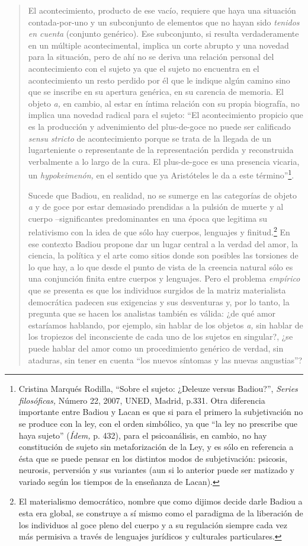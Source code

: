 \begin{quote}
El acontecimiento, producto de ese vacío, requiere que haya una situación contada-por-uno y un subconjunto de elementos que no hayan sido \emph{tenidos en cuenta} (conjunto genérico). Ese subconjunto, si resulta verdaderamente en un múltiple acontecimental, implica un corte abrupto y una novedad para la situación, pero de ahí no se deriva una relación personal del acontecimiento con el sujeto ya que el sujeto no encuentra en el acontecimiento un resto perdido por él que le indique algún camino sino que se inscribe en su apertura genérica, en su carencia de memoria. El objeto \emph{a,} en cambio, al estar en íntima relación con su propia biografía, no implica una novedad radical para el sujeto: \enquote{El acontecimiento propicio que es la producción y advenimiento del plus-de-goce no puede ser calificado \emph{sensu stricto} de acontecimiento porque se trata de la llegada de un lugarteniente o representante de la representación perdida y reconstruida verbalmente a lo largo de la cura. El plus-de-goce es una presencia vicaria, un \emph{hypokeimenón,} en el sentido que ya Aristóteles le da a este término}\footnote{Cristina Marqués Rodilla, \enquote{Sobre el sujeto: ¿Deleuze versus Badiou?}, \emph{Series filosóficas,} Número 22, 2007, UNED, Madrid, p.331. Otra diferencia importante entre Badiou y Lacan es que si para el primero la subjetivación no se produce con la ley, con el orden simbólico, ya que \enquote{la ley no prescribe que haya sujeto} (\emph{Ídem,} p. 432), para el psicoanálisis, en cambio, no hay constitución de sujeto sin metaforización de la Ley, y es sólo en referencia a ésta que se puede pensar en los distintos modos de subjetivación: psicosis, neurosis, perversión y sus variantes (aun si lo anterior puede ser matizado y variado según los tiempos de la enseñanza de Lacan).}.

Sucede que Badiou, en realidad, no se sumerge en las categorías de objeto \emph{a} y de goce por estar demasiado prendidas a la pulsión de muerte y al cuerpo --significantes predominantes en una época que legitima su relativismo con la idea de que sólo hay cuerpos, lenguajes y finitud.\footnote{El materialismo democrático, nombre que como dijimos decide darle Badiou a esta era global, se construye a sí mismo como el paradigma de la liberación de los individuos al goce pleno del cuerpo y a su regulación siempre cada vez más permisiva a través de lenguajes jurídicos y culturales particulares.} En ese contexto Badiou propone dar un lugar central a la verdad del amor, la ciencia, la política y el arte como sitios donde son posibles las torsiones de lo que hay, a lo que desde el punto de vista de la creencia natural sólo es una conjunción finita entre cuerpos y lenguajes. Pero el problema \emph{empírico} que se presenta es que los individuos surgidos de la matriz materialista democrática padecen sus exigencias y sus desventuras y, por lo tanto, la pregunta que se hacen los analistas también es válida: ¿de qué amor estaríamos hablando, por ejemplo, sin hablar de los objetos \emph{a,} sin hablar de los tropiezos del inconsciente de cada uno de los sujetos en singular?, ¿se puede hablar del amor como un procedimiento genérico de verdad, sin ataduras, sin tener en cuenta \enquote{los nuevos síntomas y las nuevas angustias}?


\end{quote}
